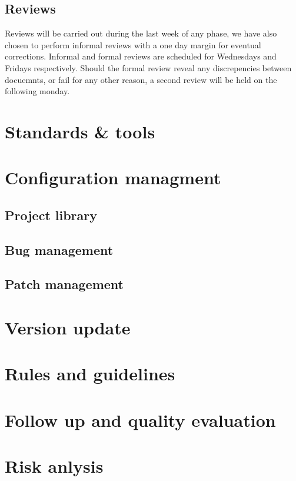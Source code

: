 \documentclass{article}
\begin{document}
    \subsection{Reviews}
        Reviews will be carried out during the last week of any phase, we have also chosen to perform informal reviews with a one day margin for eventual corrections. Informal and formal reviews are scheduled for Wednesdays and Fridays respectively. Should the formal review reveal any discrepencies between docuemnts, or fail for any other reason, a second review will be held on the following monday.
    
    \subsection{}

\section{Standards \& tools}

\section{Configuration managment}

    \subsection{Project library}
    
    \subsection{Bug management}
    
    \subsection{Patch management}

    \section{Version update}

\section{Rules and guidelines}
    
\section{Follow up and quality evaluation}

\section{Risk anlysis}
\end{document}

